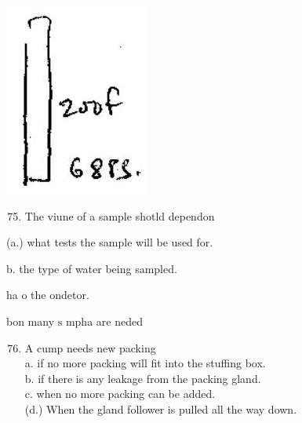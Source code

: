\documentclass[10pt]{article}
\begin{document}
\includegraphics[max width=\textwidth]{2022_11_11_ca6a6c1a0324ee23e523g-28}

\begin{enumerate}
  \setcounter{enumi}{74}
  \item The viune of a sample shotld dependon
\end{enumerate}

(a.) what tests the sample will be used for.

b. the type of water being sampled.

ha o the ondetor.

bon many $\mathrm{s}$ mpha are neded

\begin{enumerate}
  \setcounter{enumi}{75}
  \item A cump needs new packing\\
a. if no more packing will fit into the stuffing box.\\
b. if there is any leakage from the packing gland.\\
c. when no more packing can be added.\\
(d.) When the gland follower is pulled all the way down.
\end{enumerate}
\end{document}
